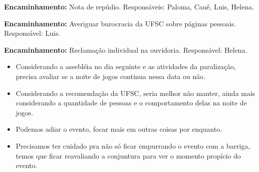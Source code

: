 \documentclass{ata-calico}
\begin{document}
\textbf{Encaminhamento:} Nota de repúdio. Responsáveis: Paloma, Cauê, Luis, Helena.

\textbf{Encaminhamento:} Averiguar burocracia da UFSC sobre páginas pessoais. Responsável: Luis.

\textbf{Encaminhamento:} Reclamação individual na ouvidoria. Responsável: Helena.

\begin{itemize}
\item Considerando a assebléia no dia seguinte e as atividades da paralização, precisa avaliar se a noite de jogos continua nessa data ou não.
\item Considerando a recomendação da UFSC, seria melhor não manter, ainda mais considerando a quantidade de pessoas e o comportamento delas na noite de jogos.
\item Podemos adiar o evento, focar mais em outras coisas por enquanto.
\item Precisamos ter cuidado pra não só ficar empurrando o evento com a barriga, temos que ficar reavaliando a conjuntura para ver o momento propício do evento.
\end{itemize}
\end{document}
